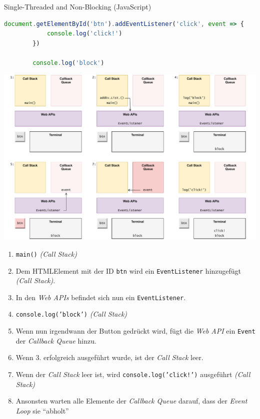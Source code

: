\begin{example}{Single-Threaded and Non-Blocking (JavaScript)}
    \begin{lstlisting}[language=JavaScript]
        document.getElementById('btn').addEventListener('click', event => {
            console.log('click!')
        })

        console.log('block')
    \end{lstlisting}

    \includegraphics[width=\textwidth]{includes/figures/example_stanb_3.pdf}

    \begin{enumerate}
        \item \texttt{main()} \emph{(Call Stack)}
        \item Dem HTMLElement mit der ID \texttt{btn} wird ein \texttt{EventListener} hinzugefügt \emph{(Call Stack)}.
        \item In den \emph{Web APIs} befindet sich nun ein \texttt{EventListener}.
        \item \texttt{console.log('block')} \emph{(Call Stack)}
        \item Wenn nun irgendwann der Button gedrückt wird, fügt die \emph{Web API} ein \texttt{Event} der \emph{Callback Queue} hinzu.
        \item Wenn 3. erfolgreich ausgeführt wurde, ist der \emph{Call Stack} leer.
        \item Wenn der \emph{Call Stack} leer ist, wird \texttt{console.log('click!')} ausgeführt \emph{(Call Stack)}
        \item Ansonsten warten alle Elemente der \emph{Callback Queue} darauf, dass der \emph{Event Loop} sie \enquote{abholt}
    \end{enumerate}
\end{example}

